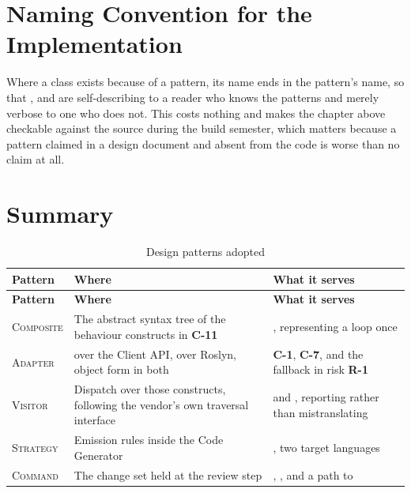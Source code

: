 \section{Naming Convention for the Implementation}

Where a class exists because of a pattern, its name ends in the pattern's name,
so that ,  and
 are self-describing to a reader who knows the
patterns and merely verbose to one who does not. This costs nothing and makes
the chapter above checkable against the source during the build semester, which
matters because a pattern claimed in a design document and absent from the code
is worse than no claim at all.

\section{Summary}

\begin{longtable}{L{0.17\textwidth}L{0.42\textwidth}L{0.33\textwidth}}
	\caption{Design patterns adopted}\label{tab:patterns-adopted}\\
	\toprule
	\textbf{Pattern} & \textbf{Where} & \textbf{What it serves} \\
	\midrule
	\endfirsthead
	\toprule
	\textbf{Pattern} & \textbf{Where} & \textbf{What it serves} \\
	\midrule
	\endhead

	\textsc{Composite} & The abstract syntax tree of the behaviour constructs
	in \textbf{C-11} & , representing a loop once \\
	\addlinespace
	\textsc{Adapter} &  over the Client API,
	 over Roslyn, object form in both &
	\textbf{C-1}, \textbf{C-7}, and the fallback in risk \textbf{R-1} \\
	\addlinespace
	\textsc{Visitor} & Dispatch over those constructs, following the vendor's
	own traversal interface &  and , reporting rather than
	mistranslating \\
	\addlinespace
	\textsc{Strategy} & Emission rules inside the Code Generator &
	, two target languages \\
	\addlinespace
	\textsc{Command} & The change set held at the review step & ,
	, and a path to  \\
	\bottomrule
\end{longtable}

